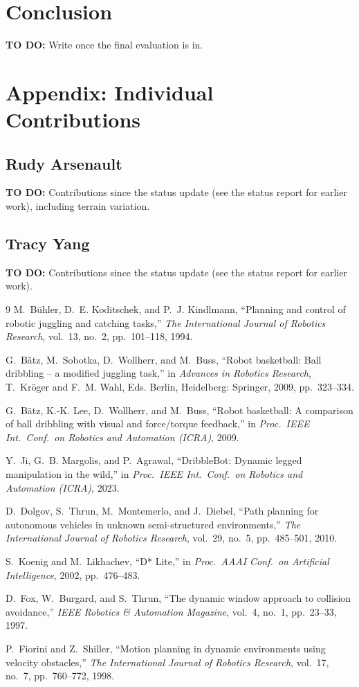 \documentclass[10pt,twocolumn]{article}
\newcommand{\gap}[1]{\par\noindent\colorbox{yellow!40}{\parbox{\dimexpr\linewidth-2\fboxsep}{\small\textbf{TO DO:} #1}}\par}
\begin{document}
\section{Conclusion}
\gap{Write once the final evaluation is in.}

\section*{Appendix: Individual Contributions}
\subsection*{Rudy Arsenault}
\gap{Contributions since the status update (see the status report for
earlier work), including terrain variation.}

\subsection*{Tracy Yang}
\gap{Contributions since the status update (see the status report for
earlier work).}

\begin{thebibliography}{9}
 M.~Bühler, D.~E. Koditschek, and P.~J. Kindlmann,
``Planning and control of robotic juggling and catching tasks,''
\emph{The International Journal of Robotics Research}, vol.~13, no.~2,
pp.~101--118, 1994.

 G.~Bätz, M.~Sobotka, D.~Wollherr, and M.~Buss, ``Robot
basketball: Ball dribbling -- a modified juggling task,'' in \emph{Advances
in Robotics Research}, T.~Kröger and F.~M. Wahl, Eds. Berlin, Heidelberg:
Springer, 2009, pp.~323--334.

 G.~Bätz, K.-K. Lee, D.~Wollherr, and M.~Buss, ``Robot
basketball: A comparison of ball dribbling with visual and force/torque
feedback,'' in \emph{Proc.\ IEEE Int.\ Conf.\ on Robotics and Automation
(ICRA)}, 2009.

 Y.~Ji, G.~B. Margolis, and P.~Agrawal, ``DribbleBot:
Dynamic legged manipulation in the wild,'' in \emph{Proc.\ IEEE Int.\ Conf.\
on Robotics and Automation (ICRA)}, 2023.

 D.~Dolgov, S.~Thrun, M.~Montemerlo, and J.~Diebel,
``Path planning for autonomous vehicles in unknown semi-structured
environments,'' \emph{The International Journal of Robotics Research},
vol.~29, no.~5, pp.~485--501, 2010.

 S.~Koenig and M.~Likhachev, ``D* Lite,'' in
\emph{Proc.\ AAAI Conf.\ on Artificial Intelligence}, 2002, pp.~476--483.

 D.~Fox, W.~Burgard, and S.~Thrun, ``The dynamic window
approach to collision avoidance,'' \emph{IEEE Robotics \& Automation
Magazine}, vol.~4, no.~1, pp.~23--33, 1997.

 P.~Fiorini and Z.~Shiller, ``Motion planning in
dynamic environments using velocity obstacles,'' \emph{The International
Journal of Robotics Research}, vol.~17, no.~7, pp.~760--772, 1998.
\end{thebibliography}
\end{document}
